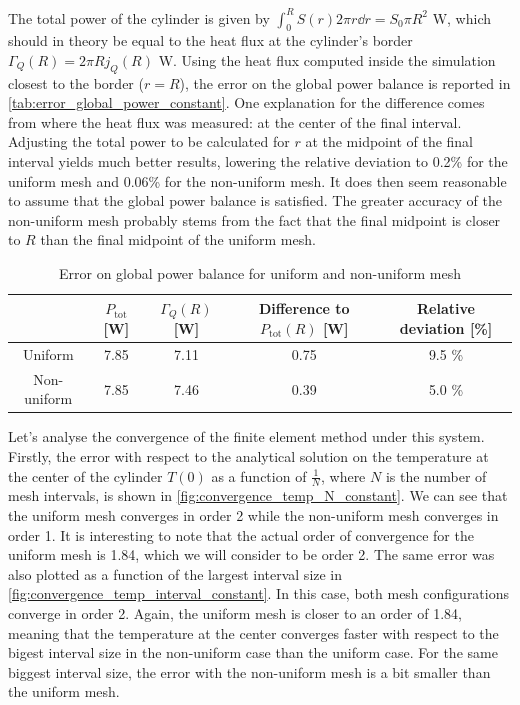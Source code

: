 The total power of the cylinder is given by \(\int_{0}^{R} S(r) 2\pi r \dd r = S_0 \pi R^2\) \si{\watt}, which should in theory be equal to the heat flux at the cylinder's border \(\Gamma_Q(R) = 2 \pi R j_Q(R)\) \si{\watt}. Using the heat flux computed inside the simulation closest to the border (\(r=R\)), the error on the global power balance is reported in \autoref{tab:error_global_power_constant}. One explanation for the difference comes from where the heat flux was measured: at the center of the final interval. Adjusting the total power to be calculated for \(r\) at the midpoint of the final interval yields much better results, lowering the relative deviation to 0.2\% for the uniform mesh and 0.06\% for the non-uniform mesh. It does then seem reasonable to assume that the global power balance is satisfied. The greater accuracy of the non-uniform mesh probably stems from the fact that the final midpoint is closer to \(R\) than the final midpoint of the uniform mesh.

\begin{table}[h]
    \centering
    \begin{tabulary}{\linewidth}{C|C C C C}
        \toprule
        & \(P_\textrm{tot}\) [\si{\watt}] & \(\Gamma_Q(R)\) [\si{\watt}] & Difference to \(P_\textrm{tot}(R)\) [\si{\watt}] & Relative deviation [\%] \\
        \midrule
        Uniform & 7.85 & 7.11 & 0.75 & 9.5 \% \\
        Non-uniform & 7.85 & 7.46 & 0.39 & 5.0 \% \\
        \bottomrule
    \end{tabulary}
    \caption{Error on global power balance for uniform and non-uniform mesh}
    \label{tab:error_global_power_constant}
\end{table}

Let's analyse the convergence of the finite element method under this system. Firstly, the error with respect to the analytical solution on the temperature at the center of the cylinder \(T(0)\) as a function of \(\frac{1}{N}\), where \(N\) is the number of mesh intervals, is shown in \autoref{fig:convergence_temp_N_constant}. We can see that the uniform mesh converges in order 2 while the non-uniform mesh converges in order 1. It is interesting to note that the actual order of convergence for the uniform mesh is 1.84, which we will consider to be order 2. The same error was also plotted as a function of the largest interval size in \autoref{fig:convergence_temp_interval_constant}. In this case, both mesh configurations converge in order 2. Again, the uniform mesh is closer to an order of 1.84, meaning that the temperature at the center converges faster with respect to the bigest interval size in the non-uniform case than the uniform case. For the same biggest interval size, the error with the non-uniform mesh is a bit smaller than the uniform mesh.

